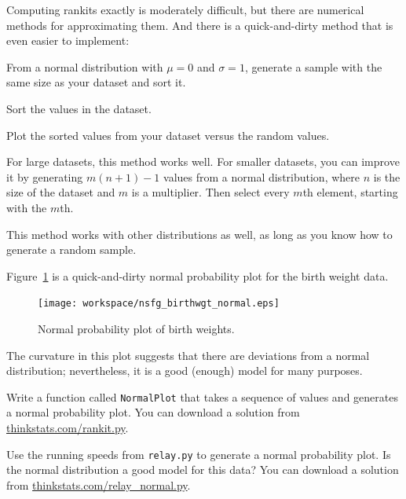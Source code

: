 \documentclass[12pt]{book}
\begin{document}

Computing rankits exactly is moderately difficult, but there are
numerical methods for approximating them.  And there is a
quick-and-dirty method that is even easier to implement:

\begin{description}

\item From a normal distribution with $\mu = 0$ and $\sigma = 1$,
generate a sample with the same size as your dataset and sort it.

\item Sort the values in the dataset.

\item Plot the sorted values from your dataset versus the random values.

\end{description}

For large datasets, this method works well.
For smaller datasets, you can improve it by generating $m (n+1) - 1$
values from a normal distribution, where $n$ is the size of the
dataset and $m$ is a multiplier.  Then select every $m$th element,
starting with the $m$th.  


This method works with other distributions as well, as long as
you know how to generate a random sample.

Figure~\ref{nsfg_birthwgt_normal} is a quick-and-dirty normal
probability plot for the birth weight data.


\begin{figure}
\centerline{\texttt{[image: workspace/nsfg\_birthwgt\_normal.eps]}}
\caption{Normal probability plot of birth weights.}
\label{nsfg_birthwgt_normal}
\end{figure}

The curvature in this plot suggests that there are
deviations from a normal distribution; nevertheless, it is a
good (enough) model for many purposes.


\begin{ex}


Write a function called {\tt NormalPlot} that takes a sequence of
values and generates a normal probability plot.  You can download
a solution from \url{thinkstats.com/rankit.py}.


Use the running speeds from {\tt relay.py} to generate a normal
probability plot.  Is the normal distribution a good model for this
data?  You can download a solution from
\url{thinkstats.com/relay_normal.py}.

\end{ex}
\end{document}
